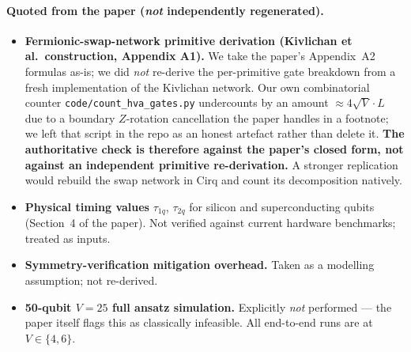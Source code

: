 \documentclass[11pt]{article}
\begin{document}
\paragraph{Quoted from the paper (\emph{not} independently regenerated).}
\begin{itemize}
  \item \textbf{Fermionic-swap-network primitive derivation (Kivlichan et al.\
        construction, Appendix A1).} We take the paper's Appendix~A2 formulas as-is;
        we did \emph{not} re-derive the per-primitive gate breakdown from a fresh
        implementation of the Kivlichan network. Our own combinatorial counter
        \texttt{code/count\_hva\_gates.py} undercounts by an amount $\approx 4\sqrt{V}\cdot L$
        due to a boundary $Z$-rotation cancellation the paper handles in a footnote;
        we left that script in the repo as an honest artefact rather than delete it.
        \textbf{The authoritative check is therefore against the paper's closed form,
        not against an independent primitive re-derivation.} A stronger replication
        would rebuild the swap network in Cirq and count its decomposition natively.
  \item \textbf{Physical timing values} $\tau_{1q}$, $\tau_{2q}$ for silicon and
        superconducting qubits (Section~4 of the paper). Not verified against
        current hardware benchmarks; treated as inputs.
  \item \textbf{Symmetry-verification mitigation overhead.} Taken as a modelling
        assumption; not re-derived.
  \item \textbf{50-qubit $V{=}25$ full ansatz simulation.} Explicitly \emph{not}
        performed --- the paper itself flags this as classically infeasible. All
        end-to-end runs are at $V\in\{4,6\}$.
\end{itemize}
\end{document}
